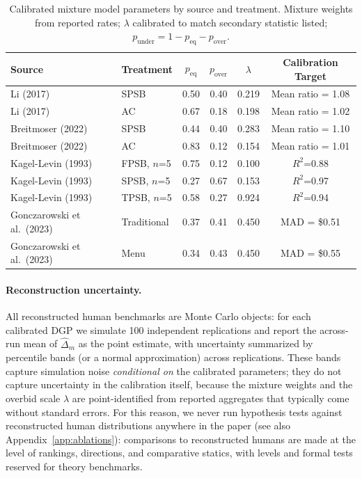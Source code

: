 \begin{table}[h]
\centering
\small
\begin{tabular}{llcccc}
\toprule
Source & Treatment & $p_{\text{eq}}$ & $p_{\text{over}}$ & $\lambda$ & Calibration Target \\
\midrule
Li (2017) & SPSB & 0.50 & 0.40 & 0.219 & Mean ratio = 1.08 \\
Li (2017) & AC & 0.67 & 0.18 & 0.198 & Mean ratio = 1.02 \\
Breitmoser (2022) & SPSB & 0.44 & 0.40 & 0.283 & Mean ratio = 1.10 \\
Breitmoser (2022) & AC & 0.83 & 0.12 & 0.154 & Mean ratio = 1.01 \\
Kagel-Levin (1993) & FPSB, $n$=5 & 0.75 & 0.12 & 0.100 & $R^2$=0.88 \\
Kagel-Levin (1993) & SPSB, $n$=5 & 0.27 & 0.67 & 0.153 & $R^2$=0.97 \\
Kagel-Levin (1993) & TPSB, $n$=5 & 0.58 & 0.27 & 0.924 & $R^2$=0.94 \\
Gonczarowski et al.\ (2023) & Traditional & 0.37 & 0.41 & 0.450 & MAD = \$0.51 \\
Gonczarowski et al.\ (2023) & Menu & 0.34 & 0.43 & 0.450 & MAD = \$0.55 \\
\bottomrule
\end{tabular}
\caption{Calibrated mixture model parameters by source and treatment. Mixture weights from reported rates; $\lambda$ calibrated to match secondary statistic listed; $p_{\text{under}} = 1 - p_{\text{eq}} - p_{\text{over}}$.}
\label{tab:mixture-calibration}
\end{table}

\paragraph{Reconstruction uncertainty.}
All reconstructed human benchmarks are Monte Carlo objects: for each calibrated DGP we simulate 100 independent replications and report the across-run mean of $\widehat{\Delta}_m$ as the point estimate, with uncertainty summarized by percentile bands (or a normal approximation) across replications. These bands capture simulation noise \emph{conditional on} the calibrated parameters; they do not capture uncertainty in the calibration itself, because the mixture weights and the overbid scale $\lambda$ are point-identified from reported aggregates that typically come without standard errors. For this reason, we never run hypothesis tests against reconstructed human distributions anywhere in the paper (see also Appendix~\ref{app:ablations}): comparisons to reconstructed humans are made at the level of rankings, directions, and comparative statics, with levels and formal tests reserved for theory benchmarks. 
